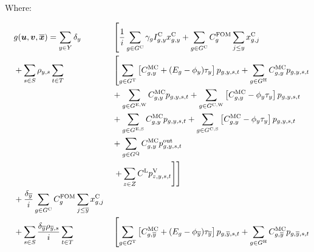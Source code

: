 \documentclass{article}
\begin{document}
Where:

\begin{alignat}{3}
	& && g(\bm{u}, \bm{v}, \overline{\bm{x}}) = \sum\limits_{\iYear \in \sYears} \cDiscountRate  &&  \left[\frac{1}{\cInterestRate} \sum\limits_{g\in \sGeneratorsCandidate} \cAmortisationRate  \cCandidateInvestmentCost \vInstalledCapacity + \sum\limits_{\iGenerator \in \sGeneratorsCandidate} \cFixedOperationsMaintenanceCostGenerator \sum\limits_{\iYearAlias \leq \iYear} \vInstalledCapacity[\iGenerator,\iYearAlias] 
	\right. \nonumber\\ 
	& && + \sum\limits_{\iScenario \in \sScenarios} \cScenarioDuration \sum\limits_{\iInterval \in \sIntervals} && \left[\sum\limits_{\iGenerator \in \sGeneratorsThermal} \left[\cMarginalCost + (\cEmissionsIntensity - \vBaseline)\vPermitPrice\right]\vPower  + \sum\limits_{\iGenerator \in \sGeneratorsHydro}\cMarginalCost \vPower \right. \nonumber\\
	& && && + \sum\limits_{\iGenerator \in \sGeneratorsExistingWind} \cMarginalCost \vPower + \sum\limits_{\iGenerator \in \sGeneratorsCandidateWind} \left[\cMarginalCost - \vBaseline \vPermitPrice\right] \vPower \nonumber\\
	& && && + \sum\limits_{\iGenerator \in \sGeneratorsExistingSolar} \cMarginalCost \vPower + \sum\limits_{\iGenerator \in \sGeneratorsCandidateSolar} \left[\cMarginalCost - \vBaseline\vPermitPrice\right] \vPower\nonumber\\
	& && && + \sum\limits_{\iGenerator \in \sStorage} \cMarginalCost \vPowerOut \nonumber\\
	& && && \left.\left. + \sum\limits_{\iZone \in \sZones} \cLostLoadCost \vLostLoadPower \right]\right] \nonumber\\
	& && + \frac{\cDiscountRate[\iYearTerminal]}{\cInterestRate}\sum\limits_{\iGenerator \in \sGeneratorsCandidate} \cFixedOperationsMaintenanceCostGenerator \sum\limits_{\iYearAlias \leq \iYearTerminal} \vInstalledCapacity[\iGenerator,\iYearAlias]\\
	& && + \sum\limits_{\iScenario \in \sScenarios} \frac{\cDiscountRate[\iYearTerminal]\cScenarioDuration[\iYearTerminal,\iScenario]}{\cInterestRate} \sum\limits_{\iInterval \in \sIntervals} && \left[\sum\limits_{\iGenerator \in \sGeneratorsThermal} \left[\cMarginalCost[\iGenerator,\iYearTerminal] + (\cEmissionsIntensity - \vBaseline[\iYearTerminal])\vPermitPrice[\iYearTerminal]\right]\vPower[\iGenerator,\iYearTerminal,\iScenario,\iInterval]  + \sum\limits_{\iGenerator \in \sGeneratorsHydro}\cMarginalCost[\iGenerator,\iYearTerminal] \vPower[\iGenerator,\iYearTerminal,\iScenario,\iInterval] \right. \nonumber\\

\end{alignat}
\end{document}

